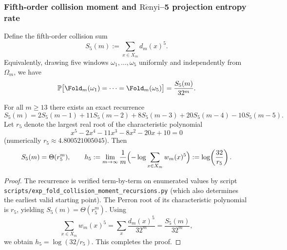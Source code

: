 \subsubsection{Fifth-order collision moment and \texorpdfstring{$\mathrm{R\acute{e}nyi}$}{Renyi}--5 projection entropy rate}\label{subsec:pom-s5}
\begin{definition}\label{def:pom-s5}
Define the fifth-order collision sum
$$
S_5(m):=\sum_{x\in X_m} d_m(x)^5.
$$
Equivalently, drawing five windows \(\omega_1,\dots,\omega_5\) uniformly and independently from \(\Omega_m\), we have
$$
\mathbb{P}\bigl[\Fold_m(\omega_1)=\cdots=\Fold_m(\omega_5)\bigr]=\frac{S_5(m)}{32^m}.
$$
\end{definition}

\begin{proposition}\label{prop:pom-s5-recurrence}
For all \(m\ge 13\) there exists an exact recurrence
$$
S_5(m)=2S_5(m-1)+11S_5(m-2)+8S_5(m-3)+20S_5(m-4)-10S_5(m-5).
$$
Let \(r_5\) denote the largest real root of the characteristic polynomial
$$
x^5-2x^4-11x^3-8x^2-20x+10=0
$$
(numerically \(r_5\approx 4.800521005045\)). Then
$$
S_5(m)=\Theta(r_5^m),
\qquad
h_5:=\lim_{m\to\infty}\frac{1}{m}\Bigl(-\log\sum_{x\in X_m}w_m(x)^5\Bigr)
:=\log\!\left(\frac{32}{r_5}\right).
$$
\end{proposition}
\begin{proof}
The recurrence is verified term-by-term on enumerated values by script \texttt{scripts/exp\_fold\_collision\_moment\_recursions.py} (which also determines the earliest valid starting point). The Perron root of its characteristic polynomial is \(r_5\), yielding \(S_5(m)=\Theta(r_5^m)\). Using
$$
\sum_{x\in X_m}w_m(x)^5=\sum_x\frac{d_m(x)^5}{32^m}=\frac{S_5(m)}{32^m},
$$
we obtain \(h_5=\log(32/r_5)\). This completes the proof.
\end{proof}

